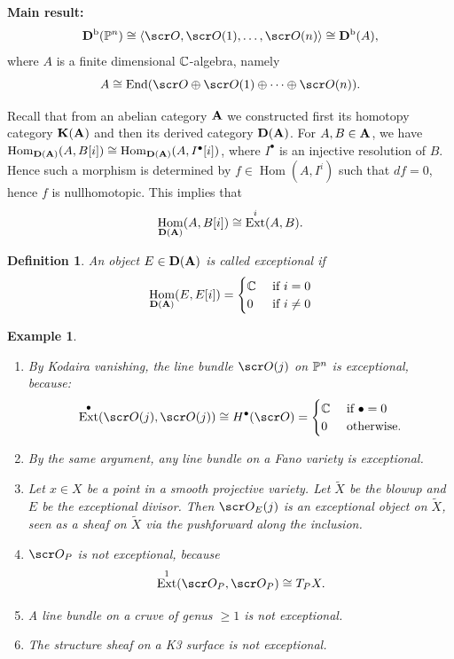 \documentclass[A4paper, british]{amsart}
\theoremstyle{darkgreentheorem}
\theoremstyle{darkbluedefinition}
\newtheorem{defn}[thm]{Definition}
\theoremstyle{darkredexample}
\newtheorem{exa}[thm]{Example}
\theoremstyle{remark}
\DeclareMathOperator{\Hom}{Hom}
\DeclareMathOperator{\Ext}{Ext}
\DeclareMathOperator{\End}{End}
\newcommand{\1}{\mathbbm{1}}
\newcommand{\op}{\oplus}
\newcommand{\grd}{^{\bullet}}
\begin{document}
\textbf{Main result:}
\[ \Db(\P^{n}) \cong \langle \O,\O(1),\ldots, \O(n) \rangle \cong \Db(A), \]
where $A$ is a finite dimensional $\C$-algebra, namely
\[ A\cong \End(\O\op \O(1) \op \cdots \op \O(n)). \]

Recall that from an abelian category $\bfA$ we constructed first its homotopy category $\K(\bfA)$ and then its derived category $\D(\bfA)$.
For $A,B\in \bfA$, we have $\Hom_{\D(\bfA)}(A,B[i])\cong \Hom_{\D(\bfA)}(A,I\grd[i])$, where $I\grd$ is an injective resolution of $B$.
Hence such a morphism is determined by $f\in \Hom(A,I^{i})$ such that $df=0$, hence $f$ is nullhomotopic.
This implies that
\[ \Hom_{\D(\bfA)}(A,B[i])\cong \Ext^{i}(A,B). \]

\begin{defn}
    An object $E\in \D(\bfA)$ is called \textit{exceptional} if
    \[ \Hom_{\D(\bfA)}(E,E[i])=\begin{cases}
	\C & \text{ if } i=0 \\
	0 & \text{ if } i\neq 0 
    \end{cases}
    \]
\end{defn}

\begin{exa}
    \begin{enumerate}
	\item By Kodaira vanishing, the line bundle $\O(j)$ on $\P^{n}$ is exceptional, because:
	    \[ \Ext\grd(\O(j),\O(j))\cong H\grd(\O)=\begin{cases}
		\C & \text{ if } \bullet=0 \\
		0 & \text{ otherwise.}
	    \end{cases}
	    \]
	\item By the same argument, any line bundle on a Fano variety is exceptional.
	\item Let $x\in X$ be a point in a smooth projective variety.
	    Let $\tilde{X}$ be the blowup and $E$ be the exceptional divisor.
	    Then $\O_{E}(j)$ is an exceptional object on $\tilde{X}$, seen as a sheaf on $\tilde{X}$ via the pushforward along the inclusion.
	\item $\O_{P}$ is not exceptional, because
	    \[ \Ext^{1}(\O_{P},\O_{P})\cong T_{P}X. \]
	\item A line bundle on a cruve of genus $\geqslant 1$ is not exceptional.
	\item The structure sheaf on a K3 surface is not exceptional.
    \end{enumerate}
\end{exa}
\end{document}
